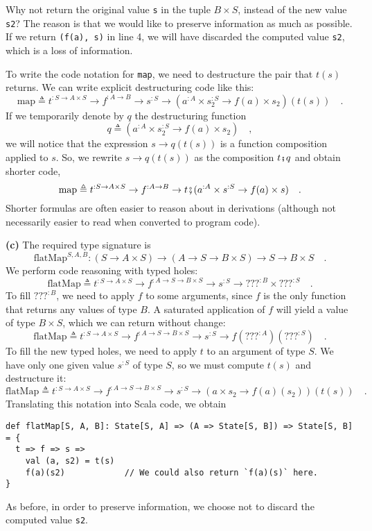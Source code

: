 \noindent Why not return the original value \lstinline!s! in the
tuple $B\times S$, instead of the new value \lstinline!s2!? The
reason is that we would like to preserve information as much as possible.
If we return \lstinline!(f(a), s)! in line 4, we will have discarded
the computed value \lstinline!s2!, which is a loss of information.

To write the code notation for \lstinline!map!, we need to destructure
the pair that $t(s)$ returns. We can write explicit destructuring
code like this:
\[
\text{map}\triangleq t^{:S\rightarrow A\times S}\rightarrow f^{:A\rightarrow B}\rightarrow s^{:S}\rightarrow(a^{:A}\times s_{2}^{:S}\rightarrow f(a)\times s_{2})(t(s))\quad.
\]
If we temporarily denote by $q$ the destructuring function 
\[
q\triangleq(a^{:A}\times s_{2}^{:S}\rightarrow f(a)\times s_{2})\quad,
\]
we will notice that the expression $s\rightarrow q(t(s))$ is a function
composition applied to $s$. So, we rewrite $s\rightarrow q(t(s))$
as the composition $t\bef q$ and obtain shorter code, 
\[
\text{map}\triangleq t^{:S\rightarrow A\times S}\rightarrow f^{:A\rightarrow B}\rightarrow t\bef(a^{:A}\times s^{:S}\rightarrow f(a)\times s)\quad.
\]
Shorter formulas are often easier to reason about in derivations (although
not necessarily easier to read when converted to program code).

\textbf{(c)} The required type signature is
\[
\text{flatMap}^{S,A,B}:(S\rightarrow A\times S)\rightarrow(A\rightarrow S\rightarrow B\times S)\rightarrow S\rightarrow B\times S\quad.
\]
We perform code reasoning with typed holes:
\[
\text{flatMap}\triangleq t^{:S\rightarrow A\times S}\rightarrow f^{:A\rightarrow S\rightarrow B\times S}\rightarrow s^{:S}\rightarrow\text{???}^{:B}\times???^{:S}\quad.
\]
To fill $\text{???}^{:B}$, we need to apply $f$ to some arguments,
since $f$ is the only function that returns any values of type $B$.
A saturated application of $f$ will yield a value of type $B\times S$,
which we can return without change:
\[
\text{flatMap}\triangleq t^{:S\rightarrow A\times S}\rightarrow f^{:A\rightarrow S\rightarrow B\times S}\rightarrow s^{:S}\rightarrow f(\text{???}^{:A})(\text{???}^{:S})\quad.
\]
To fill the new typed holes, we need to apply $t$ to an argument
of type $S$. We have only one given value $s^{:S}$ of type $S$,
so we must compute $t(s)$ and destructure it:
\[
\text{flatMap}\triangleq t^{:S\rightarrow A\times S}\rightarrow f^{:A\rightarrow S\rightarrow B\times S}\rightarrow s^{:S}\rightarrow\left(a\times s_{2}\rightarrow f(a)(s_{2})\right)(t(s))\quad.
\]
Translating this notation into Scala code, we obtain
\begin{lstlisting}
def flatMap[S, A, B]: State[S, A] => (A => State[S, B]) => State[S, B] = {
  t => f => s =>
    val (a, s2) = t(s)
    f(a)(s2)            // We could also return `f(a)(s)` here.
}
\end{lstlisting}
As before, in order to preserve information, we choose not to discard
the computed value \lstinline!s2!.

